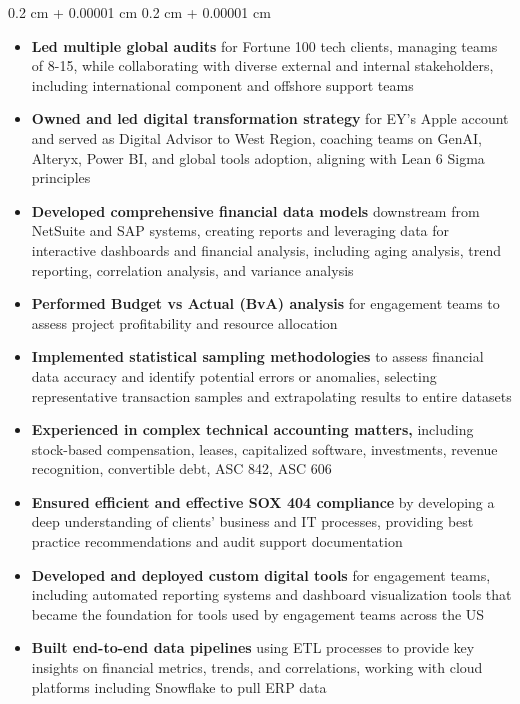 \documentclass[10pt, letterpaper]{article}
\newenvironment{highlights}{
    \begin{itemize}[
        topsep=0.10 cm,
        parsep=0.10 cm,
        partopsep=0pt,
        itemsep=0pt,
        leftmargin=0.4 cm + 10pt
    ]
}{
    \end{itemize}
} %
\newenvironment{onecolentry}{
    \begin{adjustwidth}{
        0.2 cm + 0.00001 cm
    }{
        0.2 cm + 0.00001 cm
    }
}{
    \end{adjustwidth}
} %
\begin{document}
        \begin{onecolentry}
            \begin{highlights}
                \item \textbf{Led multiple global audits} for Fortune 100 tech clients, managing teams of 8-15, while collaborating with diverse external and internal stakeholders, including international component and offshore support teams
                \item \textbf{Owned and led digital transformation strategy} for EY's Apple account and served as Digital Advisor to West Region, coaching teams on GenAI, Alteryx, Power BI, and global tools adoption, aligning with Lean 6 Sigma principles
                \item \textbf{Developed comprehensive financial data models} downstream from NetSuite and SAP systems, creating reports and leveraging data for interactive dashboards and financial analysis, including aging analysis, trend reporting, correlation analysis, and variance analysis
                \item \textbf{Performed Budget vs Actual (BvA) analysis} for engagement teams to assess project profitability and resource allocation
                \item \textbf{Implemented statistical sampling methodologies} to assess financial data accuracy and identify potential errors or anomalies, selecting representative transaction samples and extrapolating results to entire datasets
                 \item \textbf{Experienced in complex technical accounting matters,} including stock-based compensation, leases, capitalized software, investments, revenue recognition, convertible debt, ASC 842, ASC 606 %
                 \item \textbf{Ensured efficient and effective SOX 404 compliance} by developing a deep understanding of clients' business and IT processes, providing best practice recommendations and audit support documentation
                \item \textbf{Developed and deployed custom digital tools} for engagement teams, including automated reporting systems and dashboard visualization tools that became the foundation for tools used by engagement teams across the US
                \item \textbf{Built end-to-end data pipelines} using ETL processes to provide key insights on financial metrics, trends, and correlations, working with cloud platforms including Snowflake to pull ERP data

\end{highlights}
\end{onecolentry}
\end{document}

